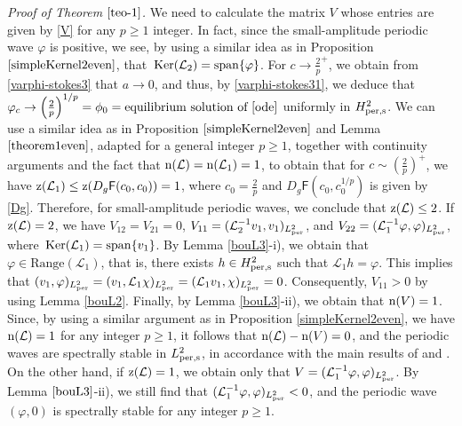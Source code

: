 \documentclass[12pt,reqno,a4paper]{amsart} %
\newcommand{\Ker}{{\rm \,Ker}}
\numberwithin{equation}{section}
\numberwithin{figure}{section}
\begin{document}
\textit{Proof of Theorem $\ref{teo-1}$.} We need to calculate the matrix $V$ whose entries are given by \eqref{V} for any $p\geq1$ integer. In fact, since the small-amplitude periodic wave $\varphi$ is positive, we see, by using a similar idea as in Proposition $\ref{simpleKernel2even}$, that $\Ker(\mathcal{L}_2)={\rm span}\{\varphi\}$. For $c \to \frac{2}{p}^{+}$, we obtain from \eqref{varphi-stokes3} that $a \to 0$, and thus, by \eqref{varphi-stokes31}, we deduce that $\varphi_c \to \left(\frac{2}{p}\right)^{1/p} = \phi_0 = \text{equilibrium solution of \eqref{ode}}$ uniformly in $H_{\rm per,s}^2$. We can use a similar idea as in Proposition $\ref{simpleKernel2even}$ and  Lemma $\ref{theorem1even}$, adapted for a general integer $p \geq 1$, together with continuity arguments and the fact that ${\rm n}(\mathcal{L}) = {\rm n}(\mathcal{L}_1) = 1$, to obtain that for $c \sim \left(\frac{2}{p}\right)^{+}$, we have ${\rm z}(\mathcal{L}_1) \leq {\rm z}(D_g \mathsf{F}(c_0, c_0)) = 1$, where $c_0 = \frac{2}{p}$ and $D_g \mathsf{F}(c_0, c_0^{1/p})$ is given by \eqref{Dg}. Therefore, for small-amplitude periodic waves, we conclude that ${\rm z}(\mathcal{L}) \leq 2$. If ${\rm z}(\mathcal{L}) = 2$, we have $V_{12} = V_{21} = 0$, $V_{11} = ( \mathcal{L}_2^{-1}v_1, v_1)_{L^2_{\rm per}}$, and $V_{22} = ( \mathcal{L}_1^{-1}\varphi, \varphi)_{L^2_{\rm per}}$, where $\Ker(\mathcal{L}_1) = {\rm span}\{v_1\}$. By Lemma \ref{bouL3}-i), we obtain that $\varphi \in \text{Range}(\mathcal{L}_1)$, that is, there exists $h \in H_{\rm per,s}^2$ such that $\mathcal{L}_1 h = \varphi$. This implies that $(v_1, \varphi)_{L^2_{\rm per}} = (v_1, \mathcal{L}_1 \chi)_{L^2_{\rm per}} = (\mathcal{L}_1 v_1, \chi)_{L^2_{\rm per}} = 0$. Consequently, $V_{11} > 0$ by using Lemma \ref{bouL2}. Finally, by Lemma \ref{bouL3}-ii), we obtain that ${\rm n}(V)=1$. Since, by using a similar argument as in Proposition \ref{simpleKernel2even}, we have ${\rm n}(\mathcal{L}) = 1$ for any integer $p \geq 1$, it follows that ${\rm n}(\mathcal{L}) - {\rm n}(V) = 0$, and the periodic waves are spectrally stable in $L_{\rm per,s}^2$, in accordance with the main results of \cite{KapitulaKevrekidisSandstedeII} and \cite{KapitulaKevrekidisSandstedeI}.\\
\indent On the other hand, if ${\rm z}(\mathcal{L}) = 1$, we obtain only that $V = (\mathcal{L}_1^{-1}\varphi, \varphi)_{L^2_{\rm per}}$. By Lemma $\ref{bouL3}$-ii), we still find that $(\mathcal{L}_1^{-1}\varphi, \varphi)_{L^2_{\rm per}} < 0$, and the periodic wave $(\varphi, 0)$ is spectrally stable for any integer $p\geq1$.  
\end{document}
